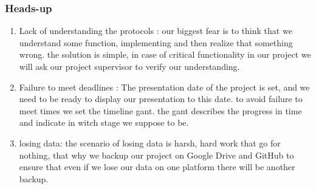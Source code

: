 \documentclass[12pt]{article}
\begin{document}
\subsubsection{Heads-up}
\begin{enumerate}
	\item Lack of understanding the protocols : our biggest fear is to think that we understand some function, implementing and then realize that something wrong. the solution is simple, in case of critical functionality in our project we will ask our project supervisor to verify our understanding. 
	
	\item Failure to meet deadlines : The presentation date of the project is set, and we need to be ready to display our presentation to this date. to avoid failure to meet times we set the timeline gant. the gant describes the progress in time and indicate in witch stage we suppose to be.
	
	\item losing data: the scenario of losing data is harsh, hard work that go for nothing, that why we backup our project on Google Drive and GitHub to ensure that even if we lose our data on one platform there will be another backup.
	
\end{enumerate}
\pagebreak
\end{document}
